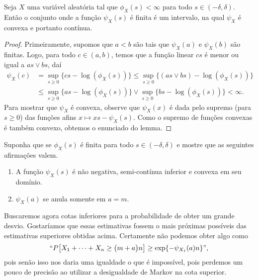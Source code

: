 \begin{lemma}
  Seja $X$ uma variável aleatória tal que $\phi_X(s) < \infty$ para todo $s \in (-\delta, \delta)$.
  Então o conjunto onde a função $\psi_X(s)$ é finita é um intervalo, na qual $\psi_X$ é convexa e portanto contínua.
\end{lemma}

\begin{proof}
  Primeiramente, supomos que $a < b$ são tais que $\psi_X(a)$ e $\psi_X(b)$ são finitas.
  Logo, para todo $c \in (a, b)$, temos que a função linear $cs$ é menor ou igual a $as \vee bs$, daí
  \begin{equation}
    \begin{split}
      \psi_X(c) &= \sup_{s \geq 0} \{cs - \log(\phi_X(s))\} \leq  \sup_{s \geq 0} \{(as \vee bs) - \log(\phi_X(s))\}\\
      & \leq \sup_{s \geq 0} \{as - \log(\phi_X(s))\} \vee \sup_{s \geq 0} \{bs - \log(\phi_X(s))\} < \infty.
    \end{split}
  \end{equation}
  Para mostrar que $\psi_X$ é convexa, observe que $\psi_X(x)$ é dada pelo supremo (para $s \geq 0$) das funções afins $x \mapsto xs - \psi_X(s)$.
  Como o supremo de funções convexas é também convexo, obtemos o enunciado do lemma.
\end{proof}


\begin{exercise}
  Suponha que se $\phi_{X}(s)$ é finita para todo $s \in (-\delta, \delta)$ e mostre que as seguintes afirmações valem.
  \begin{enumerate}[\quad a)]
  \item A função $\psi_{X}(s)$ é não negativa, semi-contínua inferior e convexa em seu domínio.
  \item $\psi_X(a)$ se anula somente em $a = m$.
  \end{enumerate}
\end{exercise}

Buscaremos agora cotas inferiores para a probabilidade de obter um grande desvio.
Gostaríamos que essas estimativas fossem o mais próximas possíveis das estimativas superiores obtidas acima.
Certamente não podemos obter algo como
\begin{equation}
  \label{e:PGDgeq_falso}
  `` P\big[ X_1 + \dots + X_n \geq \big(m + a \big) n \big] \geq \exp\{-\psi_{X_1}(a) n\} ",
\end{equation}
pois senão isso nos daria uma igualdade o que é impossível, pois perdemos um pouco de precisão ao utilizar a desigualdade de Markov na cota superior.

